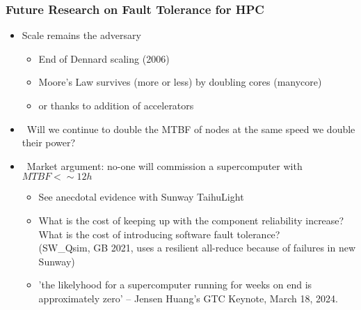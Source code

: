 \begin{frame}
  \frametitle{Future Research on Fault Tolerance for HPC}

  \begin{itemize}
  \item Scale remains the adversary
    \begin{itemize}
    \item End of Dennard scaling (2006)
    \item Moore's Law survives (more or less) by doubling cores (manycore)
    \item or thanks to addition of accelerators
    \end{itemize}
  \item ~\quesley Will we continue to double the MTBF of nodes at the same speed we double their power?
  \item ~\quesley Market argument: no-one will commission a supercomputer with $MTBF < \sim 12h$
    \begin{itemize}
    \item \frownie See anecdotal evidence with Sunway TaihuLight
    \item \smiley What is the cost of keeping up with the component reliability increase?\\
      What is the cost of introducing software fault tolerance?\\
      (SW\_Qsim, GB 2021, uses a resilient all-reduce because of failures in new Sunway)
    \item \smiley 'the likelyhood for a supercomputer running for weeks on end is approximately zero' -- Jensen Huang's GTC Keynote, March 18, 2024.
    \end{itemize}
  \end{itemize}
\end{frame}

